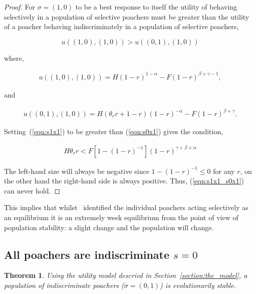 \documentclass[10pt]{article}
\newtheorem{theorem}{Theorem}
\begin{document}
\begin{proof}
    For \(\sigma=(1, 0)\) to be a best response to itself the utility of behaving 
    selectively in a population of selective poachers must be greater than the utility
    of a poacher behaving indiscriminately in a population of selective poachers,

    \begin{equation}
    u((1, 0),(1, 0)) > u((0, 1),(1, 0))
    \end{equation}
    
    where,
    
    \begin{eqnarray}
    \label{eqn:s1x1}
    u((1, 0),(1, 0)) = H(1 - r)^{1 - \alpha} - F(1 - r)^{\beta + \gamma - 1},
    \end{eqnarray}
    
    and 
    
    \begin{eqnarray}
    \label{eqn:s0x1}
    u((0, 1),(1, 0)) = H(\theta_r r +1 - r)(1 - r)^{-\alpha} - F(1 - r)^{\beta + \gamma} .
    \end{eqnarray}

    Setting~(\ref{eqn:s1x1}) to be greater than (\ref{eqn:s0x1}) gives the 
    condition,

    \begin{eqnarray}
    \label{eqn:s1x1_s0x1}
    H \theta_r r < F [1 - (1 - r)^{-1}](1 - r)^{\gamma + \beta + \alpha}
    \end{eqnarray}

    The left-hand size  will always be negative since \(1-(1-r)^{-1} \leq 0\)
    for any \(r\), on the other hand the right-hand side is always positive.
    Thus, (\ref{eqn:s1x1_s0x1}) can never hold.
\end{proof}

This implies that whilst~\cite{Lee} identified the individual poachers 
acting selectively as an equilibrium it is an extremely week equilibrium from 
the point of view of population stability: a slight change and the population 
will change.

\subsection{All poachers are indiscriminate \(s=0\)}

\begin{theorem}
Using the utility model descried in Section~\ref{section:the_model}, a population 
of indiscriminate poachers (\(\sigma=(0, 1)\)) is evolutionarily stable.
\end{theorem}
\end{document}
